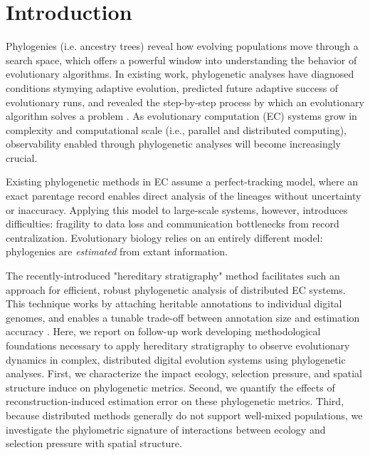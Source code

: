 \vspace{-1.5ex}
\section{Introduction}

Phylogenies (i.e. ancestry trees) reveal how evolving populations move through a search space, which offers a powerful window into understanding the behavior of evolutionary algorithms.
In existing work, phylogenetic analyses have diagnosed conditions stymying adaptive evolution, predicted future adaptive success of evolutionary runs, and revealed the step-by-step process by which an evolutionary algorithm solves a problem \citep{hernandezWhatCanPhylogenetic2022a,shahbandeganUntanglingPhylogeneticDiversity2022a,lalejiniEvolutionaryOriginsPhenotypic2016}.
As evolutionary computation (EC) systems grow in complexity and computational scale  (i.e., parallel and distributed computing), observability enabled through phylogenetic analyses will become increasingly crucial.

Existing phylogenetic methods in EC assume a perfect-tracking model, where an exact parentage record enables direct analysis of the lineages without uncertainty or inaccuracy.
Applying this model to large-scale systems, however, introduces difficulties: fragility to data loss and communication bottlenecks from record centralization.
Evolutionary biology relies on an entirely different model: phylogenies are \textit{estimated} from extant information.

The recently-introduced "hereditary stratigraphy" method facilitates such an approach for efficient, robust phylogenetic analysis of distributed EC systems.
This technique works by attaching heritable annotations to individual digital genomes, and enables a tunable trade-off between annotation size and estimation accuracy \citep{moreno2022hereditary}.
Here, we report on follow-up work developing methodological foundations necessary to apply hereditary stratigraphy to observe evolutionary dynamics in complex, distributed digital evolution systems using phylogenetic analyses.
First, we characterize the impact ecology, selection pressure, and spatial structure induce on phylogenetic metrics.
Second, we quantify the effects of reconstruction-induced estimation error on these phylogenetic metrics.
Third, because distributed methods generally do not support well-mixed populations, we investigate the phylometric signature of interactions between  ecology and selection pressure with spatial structure.

